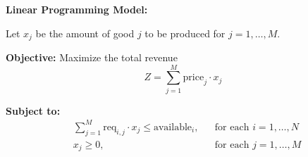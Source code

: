\documentclass{article}
\begin{document}
\textbf{Linear Programming Model:}

Let \( x_j \) be the amount of good \( j \) to be produced for \( j = 1, \ldots, M \).

\textbf{Objective:}
Maximize the total revenue
\[
Z = \sum_{j=1}^{M} \text{price}_j \cdot x_j 
\]

\textbf{Subject to:}
\begin{align*}
& \sum_{j=1}^{M} \text{req}_{i,j} \cdot x_j \leq \text{available}_{i}, && \text{for each } i = 1, \ldots, N \\
& x_j \geq 0, && \text{for each } j = 1, \ldots, M 
\end{align*}
\end{document}
